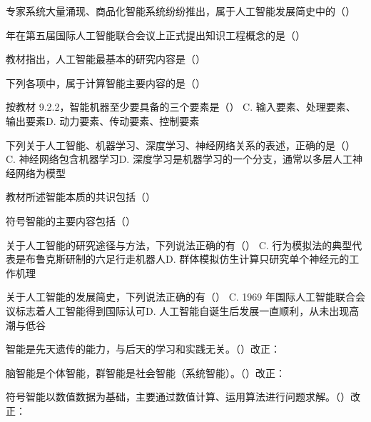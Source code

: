 \documentclass[a4paper,11pt]{article}
\begin{document}
\q 专家系统大量涌现、商品化智能系统纷纷推出，属于人工智能发展简史中的（\quad）

 年在第五届国际人工智能联合会议上正式提出知识工程概念的是（\quad）

\q 教材指出，人工智能最基本的研究内容是（\quad）

\q 下列各项中，属于计算智能主要内容的是（\quad）

\q 按教材 9.2.2，智能机器至少要具备的三个要素是（\quad）
{C. 输入要素、处理要素、输出要素}{D. 动力要素、传动要素、控制要素}

\q 下列关于人工智能、机器学习、深度学习、神经网络关系的表述，正确的是（\quad）
{C. 神经网络包含机器学习}{D. 深度学习是机器学习的一个分支，通常以多层人工神经网络为模型}

\q 教材所述智能本质的共识包括（\quad）

\q 符号智能的主要内容包括（\quad）

\q 关于人工智能的研究途径与方法，下列说法正确的有（\quad）
{C. 行为模拟法的典型代表是布鲁克斯研制的六足行走机器人}{D. 群体模拟仿生计算只研究单个神经元的工作机理}

\q 关于人工智能的发展简史，下列说法正确的有（\quad）
{C. 1969 年国际人工智能联合会议标志着人工智能得到国际认可}{D. 人工智能自诞生后发展一直顺利，从未出现高潮与低谷}

\q 智能是先天遗传的能力，与后天的学习和实践无关。\quad（\quad）\quad 改正：\fixblank

\q 脑智能是个体智能，群智能是社会智能（系统智能）。\quad（\quad）\quad 改正：\fixblank

\q 符号智能以数值数据为基础，主要通过数值计算、运用算法进行问题求解。\quad（\quad）\quad 改正：\fixblank
\end{document}
